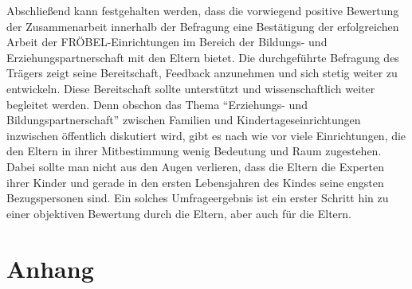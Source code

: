 \documentclass[12pt,a4paper]{article}
\begin{document}
	Abschließend kann festgehalten werden, dass die vorwiegend positive Bewertung der Zusammenarbeit innerhalb der Befragung eine Bestätigung der erfolgreichen Arbeit der FRÖBEL-Einrichtungen im Bereich der Bildungs- und Erziehungspartnerschaft mit den Eltern bietet. Die durchgeführte Befragung des Trägers zeigt seine Bereitschaft, Feedback anzunehmen und sich stetig weiter zu entwickeln. Diese Bereitschaft sollte unterstützt und wissenschaftlich weiter begleitet werden. Denn obschon das Thema "`Erziehungs- und Bildungspartnerschaft"' zwischen Familien und Kindertageseinrichtungen inzwischen öffentlich diskutiert wird, gibt es nach wie vor viele Einrichtungen, die den Eltern in ihrer Mitbestimmung wenig Bedeutung und Raum zugestehen. Dabei sollte man nicht aus den Augen verlieren, dass die Eltern die Experten ihrer Kinder und gerade in den ersten Lebensjahren des Kindes seine engsten Bezugspersonen sind. Ein solches Umfrageergebnis ist ein erster Schritt hin zu einer objektiven Bewertung durch die Eltern, aber auch für die Eltern.
	

\pagebreak	 


\printbibliography


%
%

%



\pagebreak

\begin{appendix}
\section*{Anhang}
\normalsize
\section{}
\end{appendix}
  
\end{document}
